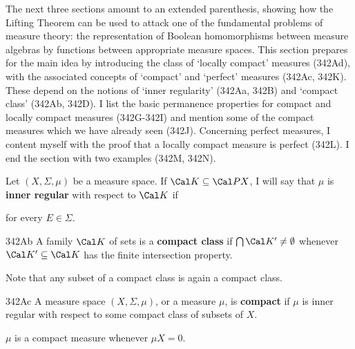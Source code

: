 
\def\chaptername{The lifting theorem}
\def\sectionname{Compact measure spaces}


The next three sections amount to an extended parenthesis, showing how
the Lifting Theorem can be used to attack one of the fundamental
problems of
measure theory:  the representation of Boolean homomorphisms between
measure algebras by functions between appropriate measure spaces.   This
section prepares for the main idea by introducing the class of `locally
compact' measures (342Ad), with the associated concepts of `compact' and
`perfect' measures (342Ac, 342K).   These depend on the notions of
`inner regularity'
(342Aa, 342B) and `compact class' (342Ab, 342D).   I list the basic
permanence properties for compact and locally compact measures
(342G-342I)
and mention some of the compact measures which we have already seen
(342J). Concerning perfect measures, I content myself with the proof
that a locally
compact measure is perfect (342L).   I end the section with two examples
(342M, 342N).

 Let $(X,\Sigma,\mu)$ be a measure space.
If $\Cal K\subseteq\Cal PX$, I will say that $\mu$ is {\bf inner
regular} with respect to $\Cal K$ if


\noindent for every $E\in\Sigma$.


\spheader 342Ab A family $\Cal K$ of sets is a {\bf compact class} if
$\bigcap\Cal K'\ne\emptyset$ whenever $\Cal K'\subseteq\Cal K$ has the
finite intersection property.

Note that any subset of a compact class is again a compact class.

\spheader 342Ac A measure space $(X,\Sigma,\mu)$, or a measure $\mu$, is
{\bf compact} if $\mu$ is inner regular with respect to some compact
class of subsets of $X$.

 $\mu$ is a compact
measure whenever $\mu X=0$.

